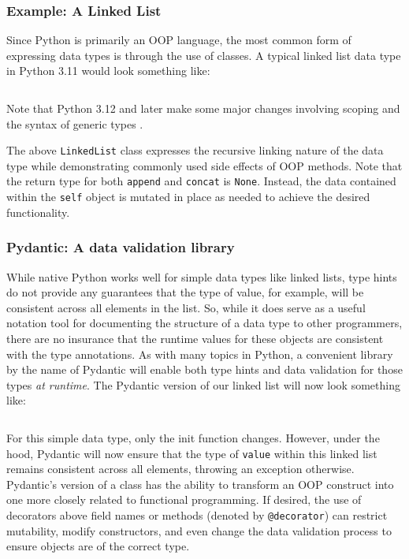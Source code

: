 \documentclass{article}
\begin{document}
\subsubsection{Example: A Linked List}

Since Python is primarily an OOP language, the most common form of expressing data types is through the use of classes.
A typical linked list data type in Python 3.11 would look something like:
\inputminted{python}{linked_list/main.py}

Note that Python 3.12 and later make some major changes involving scoping and the syntax of generic types \cite{pythonGenericTypeChange}.

The above \texttt{LinkedList} class expresses the recursive linking nature of the data type while demonstrating
commonly used side effects of OOP methods. Note that the return type for both \texttt{append} and \texttt{concat}
is \texttt{None}. Instead, the data contained within the \texttt{self} object is mutated in place as needed to achieve
the desired functionality.

\subsubsection{Pydantic: A data validation library}

While native Python works well for simple data types like linked lists, type hints do not provide any guarantees
that the type of value, for example, will be consistent across all elements in the list. So, while it does serve as a useful
notation tool for documenting the structure of a data type to other programmers, there are no insurance that the runtime
values for these objects are consistent with the type annotations. As with many topics in Python, a convenient library by the name
of Pydantic will enable both type hints and data validation for those types \textit{at runtime}. The Pydantic version
of our linked list will now look something like:
\inputminted{python}{linked_list/main_pydantic.py}

For this simple data type, only the init function changes. However, under the hood, Pydantic will now ensure that
the type of \texttt{value} within this linked list remains consistent across all elements, throwing an exception
otherwise. Pydantic's version of a class has the ability to transform an OOP construct into one more closely related
to functional programming. If desired, the use of decorators above field names or methods (denoted by \texttt{@decorator})
can restrict mutability, modify constructors, and even change the data validation process to ensure objects are of the correct type.
\end{document}
